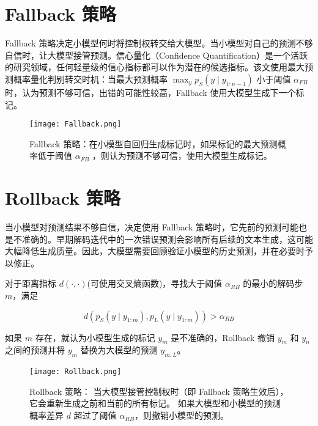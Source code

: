 \section{Fallback 策略}

Fallback 策略决定小模型何时将控制权转交给大模型。当小模型对自己的预测不够自信时，让大模型接管预测。信心量化（Confidence Quantification）是一个活跃的研究领域，任何轻量级的信心指标都可以作为潜在的候选指标。该文使用最大预测概率量化判别转交时机：当最大预测概率 $\max _y p_S\left(y \mid y_{1: n-1}\right)$ 小于阈值 $\alpha_{FB}$ 时，认为预测不够可信，出错的可能性较高，Fallback 使用大模型生成下一个标记。

\begin{figure}[htbp]
    \centering
    \texttt{[image: Fallback.png]}
    \caption{
        Fallback 策略：在小模型自回归生成标记时，如果标记的最大预测概率低于阈值 $\alpha_{FB}$ ，则认为预测不够可信，使用大模型生成标记。
    }
    \label{fig:Fallback}
\end{figure}

\section{Rollback 策略}

当小模型对预测结果不够自信，决定使用 Fallback 策略时，它先前的预测可能也是不准确的。早期解码迭代中的一次错误预测会影响所有后续的文本生成，这可能大幅降低生成质量。因此，大模型需要回顾验证小模型的历史预测，并在必要时予以修正。

对于距离指标 $d(\cdot,\cdot)$(可使用交叉熵函数)，寻找大于阈值 $\alpha_{RB}$ 的最小的解码步 $m$，满足

\begin{equation}
    d\left(p_S\left(y \mid y_{1: m}\right), p_L\left(y \mid y_{1: m}\right)\right)>\alpha_{R B}
\end{equation}

如果 $m$ 存在，就认为小模型生成的标记 $y_m$ 是不准确的，Rollback 撤销 $y_{m}$ 和 $y_{n}$ 之间的预测并将 $y_m$ 替换为大模型的预测 $y_{m,L}$。

\begin{figure}[htbp]
    \centering
    \texttt{[image: Rollback.png]}
    \caption{
        Rollback 策略：
        当大模型接管控制权时（即 Fallback 策略生效后），它会重新生成之前和当前的所有标记。
        如果大模型和小模型的预测概率差异 $d$ 超过了阈值 $\alpha_{RB}$，则撤销小模型的预测。
    }
    \label{fig:Rollback}
\end{figure}


